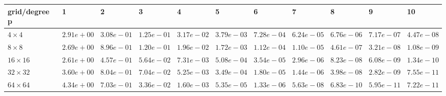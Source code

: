 \begin{tabular}{lllllllllll}
\hline
 grid/degree p   & 1          & 2          & 3          & 4          & 5          & 6          & 7          & 8          & 9          & 10         \\
\hline
 $4 \times 4$    & $2.91e+00$ & $3.08e-01$ & $1.25e-01$ & $3.17e-02$ & $3.79e-03$ & $7.28e-04$ & $6.24e-05$ & $6.76e-06$ & $7.17e-07$ & $4.47e-08$ \\
 $8 \times 8$    & $2.69e+00$ & $8.96e-01$ & $1.20e-01$ & $1.96e-02$ & $1.72e-03$ & $1.12e-04$ & $1.10e-05$ & $4.61e-07$ & $3.21e-08$ & $1.08e-09$ \\
 $16 \times 16$  & $2.61e+00$ & $4.57e-01$ & $5.64e-02$ & $7.31e-03$ & $5.08e-04$ & $3.54e-05$ & $2.96e-06$ & $8.23e-08$ & $6.08e-09$ & $1.34e-10$ \\
 $32 \times 32$  & $3.60e+00$ & $8.04e-01$ & $7.04e-02$ & $5.25e-03$ & $3.49e-04$ & $1.80e-05$ & $1.44e-06$ & $3.98e-08$ & $2.82e-09$ & $7.55e-11$ \\
 $64 \times 64$  & $4.34e+00$ & $7.03e-01$ & $3.36e-02$ & $1.60e-03$ & $5.35e-05$ & $1.33e-06$ & $5.63e-08$ & $6.83e-10$ & $5.95e-11$ & $7.22e-11$ \\
\hline
\end{tabular}